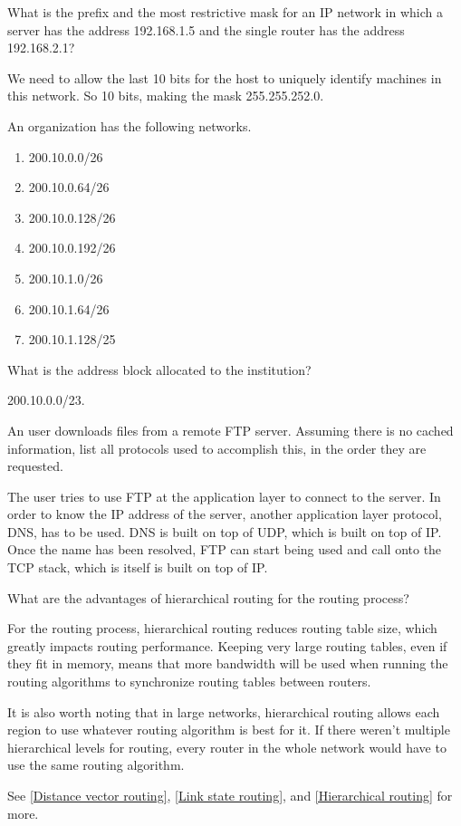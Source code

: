 \begin{Exercise}
What is the prefix and the most restrictive mask for an IP network in which a server has the address 192.168.1.5 and the single router has the address 192.168.2.1?
\end{Exercise}
\begin{Answer}
We need to allow the last 10 bits for the host to uniquely identify machines in this network.
So 10 bits, making the mask 255.255.252.0.
\end{Answer}

\begin{Exercise}
An organization has the following networks.
\begin{enumerate}
    \item 200.10.0.0/26
    \item 200.10.0.64/26
    \item 200.10.0.128/26
    \item 200.10.0.192/26
    \item 200.10.1.0/26
    \item 200.10.1.64/26
    \item 200.10.1.128/25
\end{enumerate}
What is the address block allocated to the institution?
\end{Exercise}
\begin{Answer}
200.10.0.0/23.
\end{Answer}

\begin{Exercise}
An user downloads files from a remote FTP server.
Assuming there is no cached information, list all protocols used to accomplish this, in the order they are requested.
\end{Exercise}
\begin{Answer}
The user tries to use FTP at the application layer to connect to the server.
In order to know the IP address of the server, another application layer protocol, DNS, has to be used. DNS is built on top of UDP, which is built on top of IP.
Once the name has been resolved, FTP can start being used and call onto the TCP stack, which is itself is built on top of IP.
\end{Answer}

\begin{Exercise}
What are the advantages of hierarchical routing for the routing process?
\end{Exercise}
\begin{Answer}
For the routing process, hierarchical routing reduces routing table size, which greatly impacts routing performance.
Keeping very large routing tables, even if they fit in memory, means that more bandwidth will be used when running the routing algorithms to synchronize routing tables between routers.

It is also worth noting that in large networks, hierarchical routing allows each region to use whatever routing algorithm is best for it.
If there weren't multiple hierarchical levels for routing, every router in the whole network would have to use the same routing algorithm.

See \ref{Distance vector routing}, \ref{Link state routing}, and \ref{Hierarchical routing} for more.
\end{Answer}

